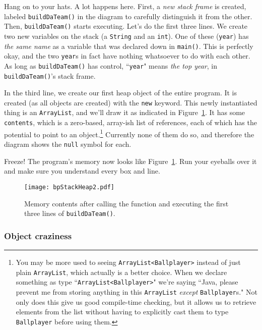 Hang on to your hats. A lot happens here. First, a \textit{new stack frame} is
created, labeled \texttt{buildDaTeam()} in the diagram to carefully
distinguish it from the other. Then, \texttt{buildDaTeam()} starts executing.
Let's do the first three lines. We create two new variables on the stack
(a \texttt{String} and an \texttt{int}). One of these (\texttt{year}) has
\textit{the same name} as a variable that was declared down in
\texttt{main()}. This is perfectly okay, and the two \texttt{year}s in fact
have nothing whatsoever to do with each other. As long as
\texttt{buildDaTeam()} has control, ``\texttt{year}" means \textit{the top
year}, in \texttt{buildDaTeam()}'s stack frame.

In the third line, we create our first heap object of the entire program. It
is created (as all objects are created) with the \texttt{new} keyword. This
newly instantiated thing is an \texttt{ArrayList}, and we'll draw it as
indicated in Figure~\ref{fig:bpStackHeap2}. It has some \texttt{contents},
which is a zero-based, array-ish list of references, each of which has the
potential to point to an object.\footnote{You may be more used to seeing
\texttt{ArrayList<Ballplayer>} instead of just plain \texttt{ArrayList}, which
actually is a better choice. When we declare something as type
``\texttt{ArrayList<Ballplayer>}" we're saying ``Java, please prevent me from
storing anything in this \texttt{ArrayList} \textit{except}
\texttt{Ballplayer}s." Not only does this give us good compile-time checking,
but it allows us to retrieve elements from the list without having to
explicitly cast them to type \texttt{Ballplayer} before using them.} Currently
none of them do so, and therefore the diagram shows the \texttt{null} symbol
for each.

Freeze! The program's memory now looks like Figure~\ref{fig:bpStackHeap2}.
Run your eyeballs over it and make sure you understand every box and line.

\begin{figure}[ht]   %
\centering
\texttt{[image: bpStackHeap2.pdf]}
\caption{Memory contents after calling the function and executing the first
three lines of \texttt{buildDaTeam()}.}
\label{fig:bpStackHeap2}
\end{figure}

\subsubsection{Object craziness}

